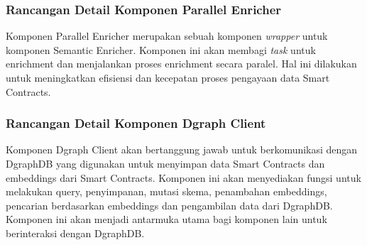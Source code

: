 \subsubsection{Rancangan Detail Komponen Parallel Enricher}

Komponen Parallel Enricher merupakan sebuah komponen \textit{wrapper} untuk komponen Semantic Enricher. Komponen ini akan membagi \textit{task} untuk enrichment dan menjalankan proses enrichment secara paralel. Hal ini dilakukan untuk meningkatkan efisiensi dan kecepatan proses pengayaan data Smart Contracts.



\subsubsection{Rancangan Detail Komponen Dgraph Client}

Komponen Dgraph Client akan bertanggung jawab untuk berkomunikasi dengan DgraphDB yang digunakan untuk menyimpan data Smart Contracts dan embeddings dari Smart Contracts. Komponen ini akan menyediakan fungsi untuk melakukan query, penyimpanan, mutasi skema, penambahan embeddings, pencarian berdasarkan embeddings dan pengambilan data dari DgraphDB. Komponen ini akan menjadi antarmuka utama bagi komponen lain untuk berinteraksi dengan DgraphDB.

